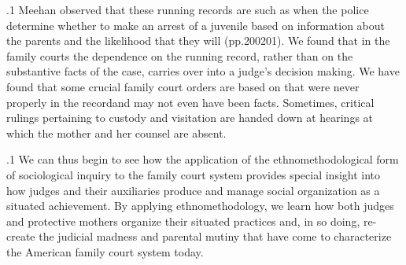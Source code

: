 \documentclass[11pt, twoside]{article}
\begin{document}
{\p.1{%
Meehan observed that these running records are  such as when the police determine whether
to make an arrest of a juvenile based on information about the parents
and the likelihood that they will  (pp.\@ 200\ndash{}201). We found that in the family courts the dependence
on the running record, rather than on the substantive facts of the case,
carries over into a judge’s decision making. We have found that some
crucial family court orders are based on  that were never properly
in the record\mdash{}and may not even have been facts. Sometimes, critical
rulings pertaining to custody and visitation are handed down at hearings
at which the mother and her counsel are absent.
}%

\p.1{%
We can thus begin to see how the application of the ethnomethodological form of sociological inquiry to the family court system provides special insight into how judges and their auxiliaries produce
and manage social organization as a situated achievement. By applying
ethnomethodology, we learn how both judges and protective mothers
organize their situated practices and, in so doing, re-create the judicial madness and parental mutiny that have come to characterize the
American family court system today.
}%





}
\end{document}
